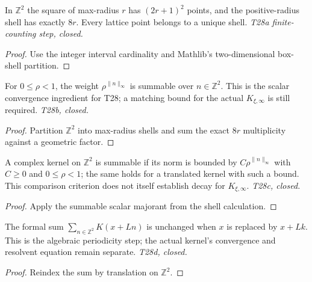\begin{lemma}\label{lem:periodize-shells}
  \leanok
  In $\mathbb Z^2$ the square of max-radius $r$ has $(2r+1)^2$ points, and the
  positive-radius shell has exactly $8r$. Every lattice point belongs to a
  unique shell. \emph{T28a finite-counting step, closed.}
\end{lemma}
\begin{proof}\leanok
  Use the integer interval cardinality and Mathlib's two-dimensional
  box-shell partition.
\end{proof}

\begin{lemma}
  \label{lem:periodize-tail}
  \leanok
  For $0\le\rho<1$, the weight $\rho^{\|n\|_\infty}$ is summable over
  $n\in\mathbb Z^2$. This is the scalar convergence ingredient for T28;
  a matching bound for the actual $K_{\xi,\infty}$ is still required.
  \emph{T28b, closed.}
\end{lemma}
\begin{proof}\leanok
  Partition $\mathbb Z^2$ into max-radius shells and sum the exact $8r$
  multiplicity against a geometric factor.
\end{proof}

\begin{lemma}
  \label{lem:periodize-convergence}
  \leanok
  A complex kernel on $\mathbb Z^2$ is summable if its norm is bounded by
  $C\rho^{\|n\|_\infty}$ with $C\ge0$ and $0\le\rho<1$; the same holds for
  a translated kernel with such a bound. This comparison criterion does not
  itself establish decay for $K_{\xi,\infty}$. \emph{T28c, closed.}
\end{lemma}
\begin{proof}\leanok
  Apply the summable scalar majorant from the shell calculation.
\end{proof}

\begin{lemma}
  \label{lem:periodize-shift}
  \leanok
  The formal sum $\sum_{n\in\mathbb Z^2}K(x+Ln)$ is unchanged when $x$ is
  replaced by $x+Lk$. This is the algebraic periodicity step; the actual
  kernel's convergence and resolvent equation remain separate.
  \emph{T28d, closed.}
\end{lemma}
\begin{proof}\leanok
  Reindex the sum by translation on $\mathbb Z^2$.
\end{proof}


